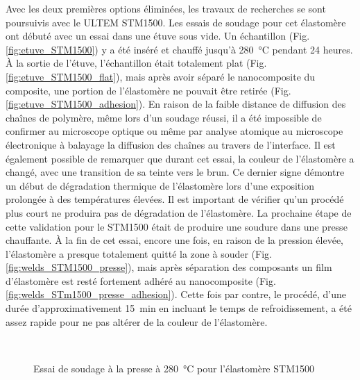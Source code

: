 Avec les deux premières options éliminées, les travaux de recherches se sont poursuivis avec le ULTEM STM1500. 
Les essais de soudage pour cet élastomère ont débuté avec un essai dans une étuve sous vide. 
Un échantillon (Fig. \ref{fig:etuve_STM1500}) y a été inséré et chauffé jusqu'à \SI{280}{\celsius} pendant 24 heures. 
À la sortie de l'étuve, l'échantillon était totalement plat (Fig. \ref{fig:etuve_STM1500_flat}), mais après avoir séparé le nanocomposite du composite, une portion de l'élastomère ne pouvait être retirée (Fig. \ref{fig:etuve_STM1500_adhesion}). 
En raison de la faible distance de diffusion des chaînes de polymère, même lors d'un soudage réussi, il a été impossible de confirmer au microscope optique ou même par analyse atomique au microscope électronique à balayage la diffusion des chaînes au travers de l'interface. 
Il est également possible de remarquer que durant cet essai, la couleur de l'élastomère a changé, avec une transition de sa teinte vers le brun.  
Ce dernier signe démontre un début de dégradation thermique de l'élastomère lors d'une exposition prolongée à des températures élevées. 
Il est important de vérifier qu'un procédé plus court ne produira pas de dégradation de l'élastomère. 
La prochaine étape de cette validation pour le STM1500 était de produire une soudure dans une presse chauffante. 
À la fin de cet essai, encore une fois, en raison de la pression élevée, l'élastomère a presque totalement quitté la zone à souder (Fig. \ref{fig:welds_STM1500_presse}), mais après séparation des composants un film d'élastomère est resté fortement adhéré au nanocomposite (Fig. \ref{fig:welds_STm1500_presse_adhesion}). 
Cette fois par contre, le procédé, d'une durée d'approximativement \SI{15}{\minute} en incluant le temps de refroidissement, a été assez rapide pour ne pas altérer de la couleur de l'élastomère. 

\begin{figure}[h]
	\centering
	 \\ 
	 \qquad
	\caption{Essai de soudage dans une étuve sous vide à \SI{280}{\celsius} pour l'élastomère STM1500}
	\label{fig:etuve_STM1500}

	\centering
	 \qquad
	\caption{Essai de soudage à la presse à \SI{280}{\celsius} pour l'élastomère STM1500}
	\label{fig:presse_STM1500}
\end{figure}


